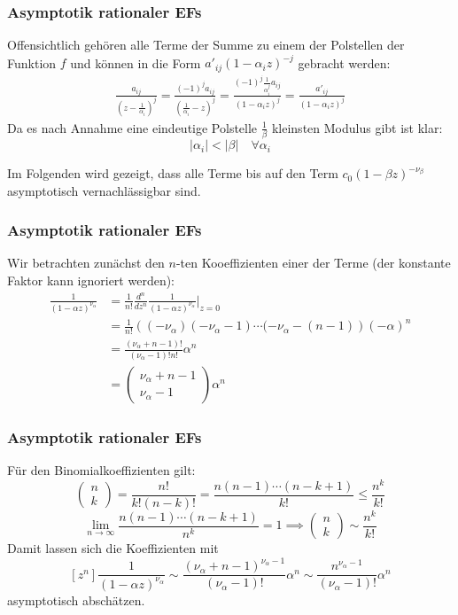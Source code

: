 \documentclass{beamer}
\begin{document}
\begin{frame}\frametitle{Asymptotik rationaler EFs}
  Offensichtlich gehören alle Terme der Summe zu einem der Polstellen der Funktion $f$ und können in die Form $a'_{ij} (1 - \alpha_i z)^{-j}$ gebracht werden:
  \begin{align*}
    \frac{a_{ij}}{(z - \frac{1}{\alpha_i})^j} = \frac{(-1)^j a_{ij}}{(\frac{1}{\alpha_i} - z)^j}
    = \frac{(-1)^j \frac{1}{\alpha_i^j} a_{ij}}{(1 - \alpha_i z)^j}
    = \frac{a'_{ij}}{(1 - \alpha_i z)^j}
  \end{align*}
  Da es nach Annahme eine eindeutige Polstelle $\frac{1}{\beta}$ kleinsten Modulus gibt ist klar:
  \[
    |\alpha_i| < |\beta| \quad \forall \alpha_i
  \]
  
  Im Folgenden wird gezeigt, dass alle Terme bis auf den Term $c_0 (1 - \beta z)^{-\nu_\beta}$ asymptotisch vernachlässigbar sind.
\end{frame}

\begin{frame}\frametitle{Asymptotik rationaler EFs}
  Wir betrachten zunächst den $n$-ten Kooeffizienten einer der Terme (der konstante Faktor kann ignoriert werden):
  \begin{align*}
    [z^n] \frac{1}{(1 - \alpha z)^{\nu_\alpha}} &= \frac{1}{n!} \frac{d^n}{dz^n} \frac{1}{(1 - \alpha z)^{\nu_\alpha}} \bigg|_{z =0} \\
    &= \frac{1}{n!} \left( (-\nu_\alpha) (-\nu_\alpha - 1) \cdots (-\nu_\alpha - (n - 1) \right) (-\alpha)^n \\
    &= \frac{(\nu_\alpha + n - 1)!}{(\nu_\alpha - 1)! n!} \alpha^n \\
    &= \begin{pmatrix}
      \nu_\alpha + n - 1 \\
      \nu_\alpha - 1
    \end{pmatrix}
    \alpha^n
  \end{align*}
\end{frame}

\begin{frame}\frametitle{Asymptotik rationaler EFs}
  Für den Binomialkoeffizienten gilt:
  \[
    \begin{pmatrix}
      n \\ k
    \end{pmatrix}
    = \frac{n!}{k! (n - k)!}
    = \frac{n (n - 1) \cdots (n - k + 1)}{k!}
    \leq \frac{n^k}{k!}
  \]
  \[
    \lim\limits_{n \rightarrow \infty} \frac{n (n - 1) \cdots (n - k + 1)}{n^k} = 1 \implies \begin{pmatrix}
      n \\ k
    \end{pmatrix} \sim \frac{n^k}{k!}
  \]
  Damit lassen sich die Koeffizienten mit
  \[
    [z^n] \frac{1}{(1 - \alpha z)^{\nu_\alpha}}
    \sim \frac{(\nu_\alpha + n - 1)^{\nu_\alpha - 1}}{(\nu_\alpha - 1)!} \alpha^n
    \sim \frac{n^{\nu_\alpha - 1}}{(\nu_\alpha - 1)!} \alpha^n
  \]
  asymptotisch abschätzen.
\end{frame}
\end{document}

